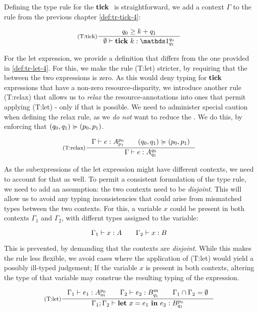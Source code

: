 Defining the type rule for the \(\mathbf{tick}~\) is straightforward, we add a context \(\Gamma\) to the rule from the previous chapter \cref{def:tr-tick-4}:

\[
   \inference[(T:tick)]
   {q_0 \geq k + q_1}
   {\typing{\emptycontext}{\tick{k}}{\ratype{\unit}{q_0}{q_1}}}
\]

For the let expression, we provide a definition that differs from the one provided in \cref{def:tr-let-4}. For this, we make the rule (T:let) stricter, by requiring that the  between the two expressions is zero. As this would deny typing for \(\mathbf{tick}~\) expressions that have a non-zero resource-disparity, we introduce another rule (T:relax) that allows us to \emph{relax} the resource-annotations into ones that permit applying (T:let) - only if that is possible. 
We need to administer special caution when defining the relax rule, as we \emph{do not} want to reduce the . We do this, by enforcing that \((q_0, q_1) \succcurlyeq (p_0, p_1)\).

\[
   \inference[(T:relax)]
   {\typing{\Gamma}{e}{\ratype{A}{p_0}{p_1}} \qquad (q_0, q_1) \relaxation (p_0, p_1)}
   {\typing{\Gamma}{e}{\ratype{A}{q_0}{q_1}}}
\]

As the subexpressions of the let expression might have different contexts, we need to account for that as well. To permit a consistent formulation of the type rule, we need to add an assumption: the two contexts need to be \emph{disjoint}. This will allow us to avoid any typing inconsistencies that could arise from mismatched types between the two contexts. 
For this, a variable \(x\) could be present in both contexts \(\Gamma_1\) and \(\Gamma_2\), with differnt types assigned to the variable:

\[
   \Gamma_1 \vdash x : A \qquad \Gamma_2 \vdash x : B
\]

This is prevented, by demanding that the contexts are \emph{disjoint}. While this makes the rule less flexible, we avoid cases where the application of (T:let) would yield a possibly ill-typed judgement; If the variable \(x\) is present in both contexts, altering the type of that variable may construe the resulting typing of the expression.

\[
   \inference[(T:let)]
   {\typing{\Gamma_1}{e_1}{\ratype{A}{p_0}{m}} \qquad \typing{\Gamma_2}{e_2}{\ratype{B}{m}{q_1}} \qquad \Gamma_1 \cap \Gamma_2 = \emptyset}
   {\typing{\Gamma_1; \Gamma_2}{\letexp{x}{e_1}{e_2}}{\ratype{B}{p_0}{q_1}}}
\]


